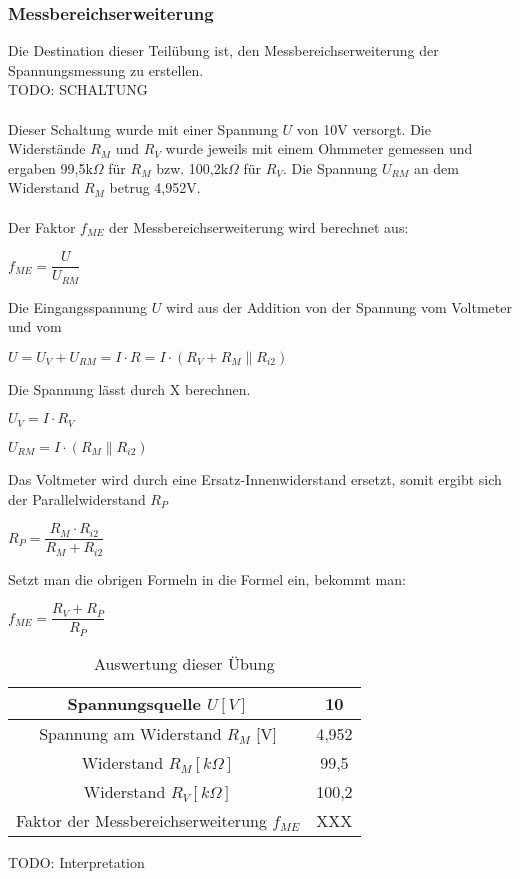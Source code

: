\subsubsection{Messbereichserweiterung}
Die Destination dieser Teilübung ist, den Messbereichserweiterung der Spannungsmessung zu erstellen.
~\\
TODO: SCHALTUNG		\\
~\\
Dieser Schaltung wurde mit einer Spannung $U$ von 10V versorgt. Die Widerstände $R_M$ und $R_V$ wurde jeweils mit einem Ohmmeter gemessen und ergaben 99,5k$\Omega$ für $R_M$ bzw. 100,2k$\Omega$ für $R_V$. Die Spannung $U_{RM}$ an dem Widerstand $R_M$ betrug 4,952V.	\\
~\\
Der Faktor $f_{ME}$ der Messbereichserweiterung wird berechnet aus:
\begin{center}
$f_{ME} = \dfrac{U}{U_{RM}}$
\end{center}
Die Eingangsspannung $U$ wird aus der Addition von der Spannung vom Voltmeter und vom 
\begin{center}
$U = U_V + U_{RM} = I \cdot R = I \cdot (R_V + R_M \parallel R_{i2})$
\end{center}
Die Spannung lässt durch X berechnen.
\begin{center}
$U_V = I \cdot R_V$
\end{center}
\begin{center}
$U_{RM} = I \cdot (R_M \parallel R_{i2})$
\end{center}
Das Voltmeter wird durch eine Ersatz-Innenwiderstand ersetzt, somit ergibt sich der Parallelwiderstand $R_P$
\begin{center}
$R_P = \dfrac{R_M \cdot R_{i2}}{R_M + R_{i2}}$
\end{center}
Setzt man die obrigen Formeln in die Formel ein, bekommt man:
\begin{center}
$f_{ME} = \dfrac{R_V + R_P}{R_P}$
\end{center}
\begin{table}[h]
	\centering
	\begin{tabular}{|c|c|}
	\hline 
	Spannungsquelle $U [V]$					& 10 		\\ 
	\hline 
	Spannung am Widerstand $R_M$ [V] 			& 4,952	\\ 
	\hline 
	Widerstand $R_M [k\Omega]$ 				& 99,5	\\ 
	\hline 
	Widerstand $R_V [k\Omega]$ 				& 100,2	\\ 
	\hline 
	Faktor der Messbereichserweiterung $f_{ME}$	& XXX	\\ 
	\hline 
	\end{tabular}
	\caption{Auswertung dieser Übung}
\end{table}
TODO: Interpretation


